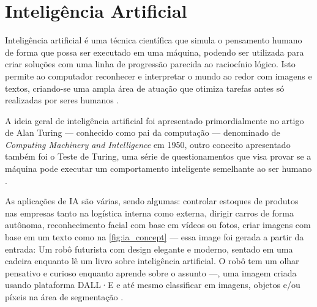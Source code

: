 \section{Inteligência Artificial}

Inteligência artificial é uma técnica científica que simula o pensamento humano de forma que possa ser executado em uma máquina, podendo ser utilizada para criar soluções com uma linha de progressão parecida ao raciocínio lógico. Isto permite ao computador reconhecer e interpretar o mundo ao redor com imagens e textos, criando-se uma ampla área de atuação que otimiza tarefas antes só realizadas por seres humanos \space\cite{ia_aliada_ou_inimiga}.



A ideia geral de inteligência artificial foi apresentado primordialmente no artigo de Alan Turing — conhecido como pai da computação — denominado de \textit{Computing Machinery and Intelligence} em 1950, outro conceito apresentado também foi o Teste de Turing, uma série de questionamentos que visa provar se a máquina pode executar um comportamento inteligente semelhante ao ser humano \space\cite{NationalGeographic2023}.

As aplicações de IA são várias, sendo algumas: controlar estoques de produtos nas empresas tanto na logística interna como externa, dirigir carros de forma autônoma, reconhecimento facial com base em vídeos ou fotos, criar imagens com base em um texto como na \cref{fig:ia_concept} — essa image foi gerada a partir da entrada: Um robô futurista com design elegante e moderno, sentado em uma cadeira enquanto lê um livro sobre inteligência artificial. O robô tem um olhar pensativo e curioso enquanto aprende sobre o assunto —, uma imagem criada usando plataforma DALL·E e até mesmo classificar em imagens, objetos e/ou píxeis na área de segmentação \space\cite{Stefanini, OpenAI2021}.

